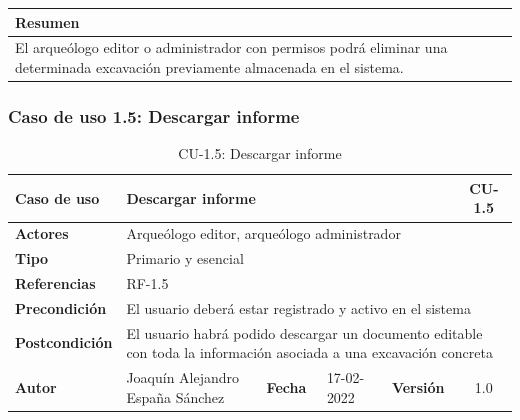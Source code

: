     \begin{table}[H]
        \centering
        \begin{tabularx}{\textwidth}{@{} |L |@{}} \hline
            \textbf{Resumen} \\
            \hline
            El arqueólogo editor o administrador con permisos podrá eliminar una determinada
            excavación previamente almacenada en el sistema. \\
            \hline
        \end{tabularx}
    \end{table}

\subsubsection{Caso de uso 1.5: Descargar informe}

    \begin{table}[H]
    \begin{center}
        \begin{adjustbox}{width=\textwidth}
        \begin{tabular}{ | l | l | l | l | c | c | } 
            \hline
            \textbf{Caso de uso} & \multicolumn{4}{l|}{Descargar informe} & \cellcolor{gray!50} \textbf{CU-1.5}\\
            \hline
            \textbf{Actores} & \multicolumn{5}{p{0.9\linewidth}|}{Arqueólogo editor, arqueólogo administrador} \\
            \hline
            \textbf{Tipo} & \multicolumn{5}{l|}{Primario y esencial} \\
            \hline
            \textbf{Referencias} & \multicolumn{3}{l|}{RF-1.5} & \multicolumn{2}{l|}{ }\\
            \hline
            \textbf{Precondición} & \multicolumn{5}{l|}{El usuario deberá estar registrado y activo en el sistema} \\
            \hline
            \textbf{Postcondición} & \multicolumn{5}{p{1.0\linewidth}|}{El usuario habrá podido descargar un documento editable con toda
            la información asociada a una excavación concreta} \\
            \hline
            \textbf{Autor} & \multicolumn{1}{p{0.25\linewidth}|}{Joaquín Alejandro España Sánchez} & \textbf{Fecha} & 
            17-02-2022     & \textbf{Versión}                                                      & 1.0\\
            \hline
        \end{tabular}
        \end{adjustbox}
        \caption{CU-1.5: Descargar informe}
        \label{tab:download-report}
    \end{center}
    \end{table}

